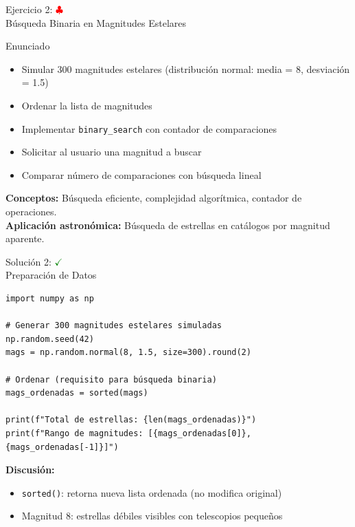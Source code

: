 \documentclass[10pt]{beamer}
\begin{document}
\begin{frame}[fragile]{Ejercicio 2: \hfill \textcolor{red}{$\clubsuit$} \\ Búsqueda Binaria en Magnitudes Estelares}
  \begin{block}{Enunciado}
    \begin{itemize}
      \item Simular 300 magnitudes estelares (distribución normal: media = 8, desviación = 1.5)
      \item Ordenar la lista de magnitudes
      \item Implementar \texttt{binary\_search} con contador de comparaciones
      \item Solicitar al usuario una magnitud a buscar
      \item Comparar número de comparaciones con búsqueda lineal
    \end{itemize}
  \end{block}
  
  \textbf{Conceptos:} Búsqueda eficiente, complejidad algorítmica, contador de operaciones.
  \\
  \textbf{Aplicación astronómica:} Búsqueda de estrellas en catálogos por magnitud aparente.
\end{frame}

\begin{solutionblock}
\begin{frame}[fragile]{Solución 2: \hfill \textcolor{green}{$\checkmark$} \\ Preparación de Datos}
\begin{verbatim}
import numpy as np

# Generar 300 magnitudes estelares simuladas
np.random.seed(42)
mags = np.random.normal(8, 1.5, size=300).round(2)

# Ordenar (requisito para búsqueda binaria)
mags_ordenadas = sorted(mags)

print(f"Total de estrellas: {len(mags_ordenadas)}")
print(f"Rango de magnitudes: [{mags_ordenadas[0]}, {mags_ordenadas[-1]}]")
\end{verbatim}

\textbf{Discusión:}
\begin{itemize}
  \item \texttt{sorted()}: retorna nueva lista ordenada (no modifica original)
  \item Magnitud 8: estrellas débiles visibles con telescopios pequeños
\end{itemize}
\end{frame}
\end{solutionblock}
\end{document}
